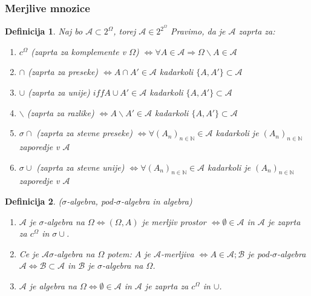 \documentclass[a4paper,12pt]{article}
\newtheorem{definicija}{Definicija}
\newcommand{\N}{\mathbb{N}}
\begin{document}
        \subsubsection{Merjlive mnozice}
            \begin{definicija}
                Naj bo $\mathcal{A} \subset 2^\Omega$, torej $\mathcal{A} \in 2^{2^\Omega}$ Pravimo, da je $\mathcal{A}$ zaprta za:
                \begin{enumerate}
                    \item $c^\Omega$ (zaprta za komplemente v $\Omega$) $\iff \forall A \in \mathcal{A} \Rightarrow \Omega \backslash A \in \mathcal{A} $
                    \item $\cap $ (zaprta za preseke) $\iff A \cap A' \in \mathcal{A}$ kadarkoli $\{A, A'\} \subset \mathcal{A}$
                    \item $\cup$ (zaprta za unije) $iff A \cup A' \in \mathcal{A}$ kadarkoli $\{A, A'\} \subset \mathcal{A}$
                    \item $\backslash$ (zaprta za razlike) $\iff A \backslash A' \in \mathcal{A}$ kadarkoli $\{A, A'\} \subset \mathcal{A}$
                    \item $\sigma\cap$ (zaprta za stevne preseke) $\iff \forall (A_n)_{n \in \N} \in \mathcal{A}$ kadarkoli je $\left(A_n \right)_{n \in \N}$ zaporedje v $\mathcal{A}$
                    \item $\sigma\cup$ (zaprta za stevne unije) $\iff \forall (A_n)_{n \in \N} \in \mathcal{A} $ kadarkoli je $\left(A_n \right)_{n \in \N}$ zaporedje v $\mathcal{A}$
                
                \end{enumerate} 
            \end{definicija}
            
            \begin{definicija}($\sigma$-algebra, pod-$\sigma$-algebra in algebra)
                \begin{enumerate}
                    \item$\mathcal{A}$ je $\sigma$-algebra na $\Omega \iff (\Omega, A)$ je merljiv prostor $\iff \emptyset \in \mathcal{A}$ in $\mathcal{A}$ je zaprta za $c^\Omega$ in $\sigma\cup$. 
                    \item Ce je $\mathcal{A} \sigma$-algebra na $\Omega$ potem: $A$ je $\mathcal{A}$-merljiva $\iff A \in \mathcal{A}; \mathcal{B}$ je pod-$\sigma$-algebra $\mathcal{A} \iff \mathcal{B} \subset \mathcal{A}$ in $\mathcal{B}$ je $\sigma$-algebra na $\Omega$.
                    \item $\mathcal{A}$ je algebra na $\Omega \iff \emptyset \in \mathcal{A}$ in $\mathcal{A}$ je zaprta za $c^\Omega$ in $\cup$.
                \end{enumerate}
            \end{definicija}
\end{document}
